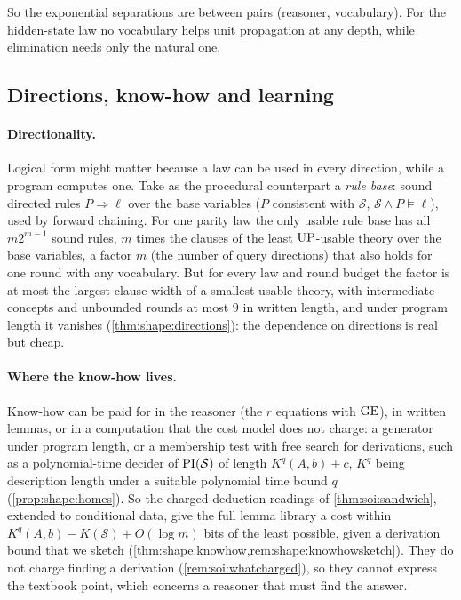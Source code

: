 So the exponential separations are between pairs (reasoner, vocabulary). For the hidden-state law no vocabulary helps unit propagation at any depth, while elimination needs only the natural one.

\subsection{Directions, know-how and learning}\label{sec:shape:directions}

\paragraph{Directionality.} Logical form might matter because a law can be used in every direction, while a program computes one. Take as the procedural counterpart a \emph{rule base}: sound directed rules $P\Rightarrow\ell$ over the base variables ($P$ consistent with $\mathcal S$, $\mathcal S\wedge P\models\ell$), used by forward chaining. For one parity law the only usable rule base has all $m2^{m-1}$ sound rules, $m$ times the clauses of the least $\mathrm{UP}$-usable theory over the base variables, a factor $m$ (the number of query directions) that also holds for one round with any vocabulary. But for every law and round budget the factor is at most the largest clause width of a smallest usable theory, with intermediate concepts and unbounded rounds at most $9$ in written length, and under program length it vanishes (\cref{thm:shape:directions}): the dependence on directions is real but cheap.

\paragraph{Where the know-how lives.}\label{sec:shape:homes} Know-how can be paid for in the reasoner (the $r$ equations with $\mathrm{GE}$), in written lemmas, or in a computation that the cost model does not charge: a generator under program length, or a membership test with free search for derivations, such as a polynomial-time decider of $\mathrm{PI}(\mathcal S)$ of length $K^q(A,b)+c$, $K^q$ being description length under a suitable polynomial time bound $q$ (\cref{prop:shape:homes}). So the charged-deduction readings of \cref{thm:soi:sandwich}, extended to conditional data, give the full lemma library a cost within $K^q(A,b)-K(\mathcal S)+O(\log m)$ bits of the least possible, given a derivation bound that we sketch (\cref{thm:shape:knowhow,rem:shape:knowhowsketch}). They do not charge finding a derivation (\cref{rem:soi:whatcharged}), so they cannot express the textbook point, which concerns a reasoner that must find the answer.

